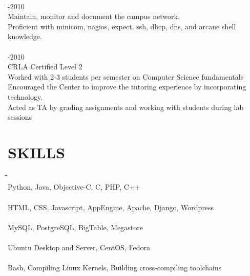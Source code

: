 \documentclass{res}
\begin{document}
\begin{resume}
\begin{tabbing}
\\

    \hspace{-0.25in}{\bf Student Network + Systems Admin, Chapman University IS\&T} \> -2010\\
	 Maintain, monitor and document the campus network.\\
	 Proficient with minicom, nagios, expect, ssh, dhcp, dns, and arcane shell knowledge.\\

\\

   \hspace{-0.25in}{\bf Math/Computer Science Tutor, Chapman University Center for Academic Success} \> -2010\\
	 CRLA Certified Level 2\\
	 Worked with 2-3 students per semester on Computer Science fundamentals\\
	 Encouraged the Center to improve the tutoring experience by incorporating technology.\\
	 Acted as TA by grading assignments and working with students during lab sessions\\
	\end{tabbing}

   \vspace{-0.4in}	
\section{SKILLS}
	\vspace{-5pt}
   \begin{tabbing}
   \hspace{2.5in}\= \hspace{3.45in}\= \kill %
    \hspace{-0.25in}{\bf Programming Languages} \> \> \\
	Python, Java, Objective-C, C, PHP, C++\\
    \hspace{-0.25in}{\bf Web Development} \> \> \\
	HTML, CSS, Javascript, AppEngine, Apache, Django, Wordpress\\
    \hspace{-0.25in}{\bf Databases} \> \> \\
	MySQL, PostgreSQL, BigTable, Megastore\\
    \hspace{-0.25in}{\bf Operating Systems} \> \> \\
	Ubuntu Desktop and Server, CentOS, Fedora\\
    \hspace{-0.25in}{\bf Systems Administration} \> \> \\
        Bash, Compiling Linux Kernels, Building cross-compiling toolchains\\


\end{tabbing}
\end{resume}
\end{document}
